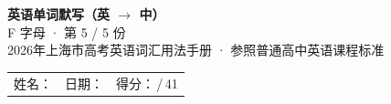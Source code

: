 \documentclass[10pt,a4paper]{article}
\begin{document}
\pagestyle{plain}

\begin{center}
{\LARGE\bfseries 英语单词默写（英 $\to$ 中）}\\[0.22em]
{\large F 字母 · 第 5 / 5 份}\\[0.18em]
{\small 2026年上海市高考英语词汇用法手册 · 参照普通高中英语课程标准}
\end{center}

\vspace{0.25em}
\noindent\begin{tabular}{@{}p{}@{}p{}@{}p{}@{}}
姓名：\underline{\hspace{2.0cm}} & 日期：\underline{\hspace{2.0cm}} & 得分：\underline{\hspace{1.3cm}}\,/\,41 \\
\end{tabular}

\vspace{0.3em}

\vspace{0.08em}
\end{document}
